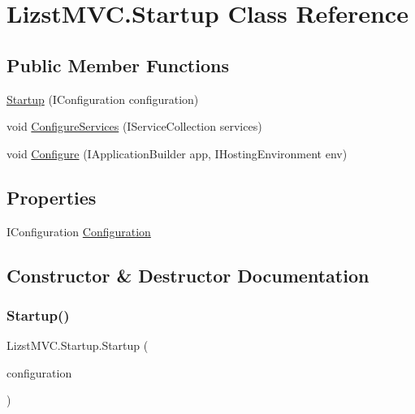\hypertarget{class_lizst_m_v_c_1_1_startup}{}\section{Lizst\+M\+V\+C.\+Startup Class Reference}
\label{class_lizst_m_v_c_1_1_startup}
\subsection*{Public Member Functions}
\begin{DoxyCompactItemize}
\item 
\mbox{\hyperlink{class_lizst_m_v_c_1_1_startup_a2b4f268a974301a07aab9d499beed17a}{Startup}} (I\+Configuration configuration)
\item 
void \mbox{\hyperlink{class_lizst_m_v_c_1_1_startup_abe6142263e61bb76fdff62e7b5574690}{Configure\+Services}} (I\+Service\+Collection services)
\item 
void \mbox{\hyperlink{class_lizst_m_v_c_1_1_startup_a9dd901440accd8a86d0deda9e8086d3d}{Configure}} (I\+Application\+Builder app, I\+Hosting\+Environment env)
\end{DoxyCompactItemize}
\subsection*{Properties}
\begin{DoxyCompactItemize}
\item 
I\+Configuration \mbox{\hyperlink{class_lizst_m_v_c_1_1_startup_a4cee12de48dfde0d438ff2f1afdfa9c3}{Configuration}}
\end{DoxyCompactItemize}


\subsection{Constructor \& Destructor Documentation}
\mbox{\label{class_lizst_m_v_c_1_1_startup_a2b4f268a974301a07aab9d499beed17a}} 
\subsubsection{\texorpdfstring{Startup()}{Startup()}}
{\footnotesize\ttfamily Lizst\+M\+V\+C.\+Startup.\+Startup (\begin{DoxyParamCaption}\item[{I\+Configuration}]{configuration }\end{DoxyParamCaption})}



